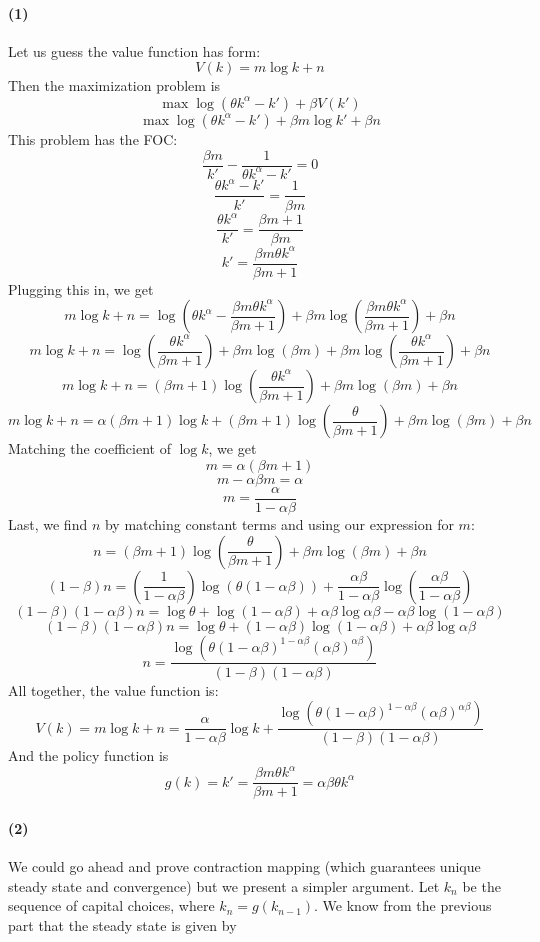 \documentclass[10pt,letter]{article}
\newcommand{\problempart}[1]{\paragraph{#1}}
\begin{document}
\problempart{(1)}
Let us guess the value function has form:
\[ V(k) = m \log k + n \]
Then the maximization problem is
\[ \max \log(\theta k^\alpha - k') + \beta V(k') \]
\[ \max \log(\theta k^\alpha - k') + \beta m \log k' + \beta n \]
This problem has the FOC:
\[ \frac{\beta m }{k'}- \frac{1}{\theta k^\alpha - k'} = 0 \]
\[ \frac{\theta k^\alpha - k'}{k'} = \frac{1}{\beta m } \]
\[ \frac{\theta k^\alpha}{k'} = \frac{\beta m + 1}{\beta m } \]
\[ k' = \frac{\beta m \theta k^\alpha }{\beta m + 1} \]
Plugging this in, we get
\[  m \log k + n = \log\left(\theta k^\alpha - \frac{\beta m \theta k^\alpha }{\beta m + 1} \right) + \beta m \log \left(\frac{\beta m \theta k^\alpha }{\beta m + 1}\right) + \beta n \]
\[  m \log k + n = \log\left(\frac{\theta k^\alpha }{\beta m + 1} \right) + \beta m \log (\beta m) +  \beta m \log \left(\frac{\theta k^\alpha }{\beta m + 1}\right) + \beta n \]
\[ m \log k + n = (\beta m + 1)\log\left(\frac{\theta k^\alpha }{\beta m + 1} \right) + \beta m \log (\beta m) + \beta n \]
\[ m \log k + n = \alpha (\beta m + 1)\log k + (\beta m + 1)\log\left(\frac{\theta  }{\beta m + 1} \right)  + \beta m \log (\beta m) + \beta n \]
Matching the coefficient of $\log k$, we get
\[ m = \alpha (\beta m + 1) \]
\[ m - \alpha \beta m = \alpha  \]
\[ m = \frac{\alpha }{1 - \alpha \beta} \]
Last, we find $n$ by matching constant terms and using our expression for $m$:
\[ n = (\beta m + 1)\log\left(\frac{\theta  }{\beta m + 1} \right)  + \beta m \log (\beta m) + \beta n \]
\[ (1-\beta) n = \left(\frac{1}{1 - \alpha \beta}\right)\log\left(\theta(1-\alpha\beta)   \right)  + \frac{\alpha\beta}{1-\alpha\beta}  \log \left(\frac{\alpha\beta}{1-\alpha\beta}\right) \]
\[ (1-\beta)(1-\alpha\beta) n = \log \theta + \log(1-\alpha\beta)   + \alpha\beta \log \alpha\beta - \alpha\beta\log(1-\alpha\beta) \]
\[ (1-\beta)(1-\alpha\beta) n = \log \theta + (1-\alpha\beta)\log(1-\alpha\beta)   + \alpha\beta \log \alpha\beta \]
\[  n =\frac{ \log \left( \theta (1-\alpha\beta)^{1-\alpha\beta} (\alpha\beta)^{\alpha\beta}\right)}{(1-\beta)(1-\alpha\beta)} \]
All together, the value function is:
\[ V(k) = m \log k + n = \frac{\alpha }{1 - \alpha \beta}\log k + \frac{ \log \left( \theta (1-\alpha\beta)^{1-\alpha\beta} (\alpha\beta)^{\alpha\beta}\right)}{(1-\beta)(1-\alpha\beta)} \]
And the policy function is
\[ g(k) = k' = \frac{\beta m \theta k^\alpha }{\beta m + 1} =  \alpha\beta \theta k^\alpha \]
\problempart{(2)}
We could go ahead and prove contraction mapping (which guarantees unique steady state and convergence) but we present a simpler argument. Let $k_n$ be the sequence of capital choices, where $k_n = g(k_{n-1})$. We know from the previous part that the steady state is given by
\end{document}

